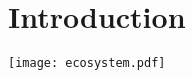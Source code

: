 \begin{frame}
    \titlepage
\end{frame}

\section{Introduction}


\begin{frame}
    \texttt{[image: ecosystem.pdf]}
\end{frame}



